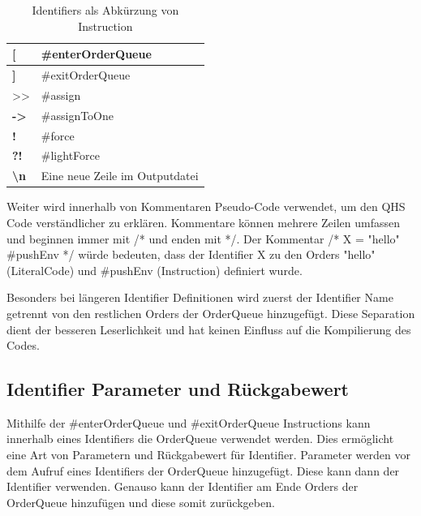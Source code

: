 {
\begin{table}[H]
    \centering
    \caption{Identifiers als Abkürzung von Instruction}
    \vspace{3mm} %
    \label{tab:shortcuts}
    
    \begin{tabular}{>{\listingFont\selectfont}l|l}
    \textbf{{[}}                 & \#enterOrderQueue              \\ \hline
    \textbf{{]}}                 & \#exitOrderQueue               \\ \hline
    \textgreater{}\textgreater{} & \#assign                       \\ \hline
    \textbf{-\textgreater{}}     & \#assignToOne                  \\ \hline
    \textbf{!}                   & \#force                        \\ \hline
    \textbf{?!}                  & \#lightForce                   \\ \hline
    \textbf{\textbackslash{}n}   & Eine neue Zeile im Outputdatei
    \end{tabular}
\end{table}
}

Weiter wird innerhalb von Kommentaren Pseudo-Code verwendet, um den QHS Code verständlicher zu erklären. Kommentare können mehrere Zeilen umfassen und beginnen immer mit /* und enden mit */.
Der Kommentar /* X = "hello" \#pushEnv */ würde bedeuten, dass der Identifier X zu den Orders "hello" (LiteralCode) und \#pushEnv (Instruction) definiert wurde. 

Besonders bei längeren Identifier Definitionen wird zuerst der Identifier Name getrennt von den restlichen Orders der OrderQueue hinzugefügt.
Diese Separation dient der besseren Leserlichkeit und hat keinen Einfluss auf die Kompilierung des Codes.

\subsection{Identifier Parameter und Rückgabewert}
Mithilfe der \#enterOrderQueue und \#exitOrderQueue Instructions kann innerhalb eines Identifiers die OrderQueue verwendet werden. Dies ermöglicht eine Art von Parametern und Rückgabewert für Identifier.
Parameter werden vor dem Aufruf eines Identifiers der OrderQueue hinzugefügt. Diese kann dann der Identifier verwenden. Genauso kann der Identifier am Ende Orders der OrderQueue hinzufügen und diese somit zurückgeben.

